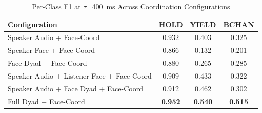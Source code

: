 \begin{table}[h]
\caption{Per-Class F1 at $\tau$=400~ms Across Coordination Configurations}
\label{tab:f1_per_class_coordination}
\small
\renewcommand{\arraystretch}{1.20}
\begin{tabular}{>{\raggedright\arraybackslash}p{4cm}ccc}
\toprule
Configuration & HOLD & YIELD & BCHAN \\
\midrule
Speaker Audio + Face-Coord & 0.932 & 0.403 & 0.325 \\
Speaker Face + Face-Coord & 0.866 & 0.132 & 0.201 \\
Face Dyad + Face-Coord & 0.880 & 0.265 & 0.285 \\
Speaker Audio + Listener Face + Face-Coord & 0.909 & 0.433 & 0.322 \\
Speaker Audio + Face Dyad + Face-Coord & 0.912 & 0.462 & 0.302 \\
Full Dyad + Face-Coord & \textbf{0.952} & \textbf{0.540} & \textbf{0.515} \\
\bottomrule
\end{tabular}
\end{table}
